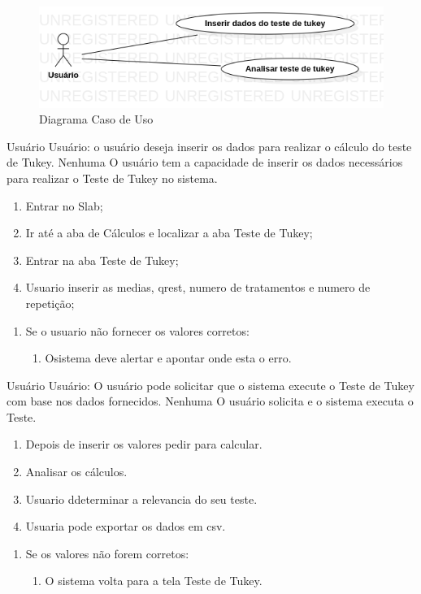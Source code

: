 \begin{figure}[H]
  \centering
  \includegraphics[width=0.8\linewidth]{imagens/casodeuso.png} 
  \caption{Diagrama Caso de Uso}
  \label{fig:exemplo}
\end{figure}


{Usuário}
{Usuário: o usuário deseja inserir os dados para realizar o cálculo do teste de Tukey.}
{Nenhuma}
{O usuário tem a capacidade de inserir os dados necessários para realizar o Teste de Tukey no sistema.}
{
	\begin{enumerate}[label=FB\arabic*.]
		
		\item Entrar no Slab;
		\item Ir até a aba de Cálculos e localizar a aba Teste de Tukey;
		\item Entrar na aba Teste de Tukey;
		\item Usuario inserir as medias, qrest, numero de tratamentos e numero de repetição;
		
	\end{enumerate}
}{
	\begin{enumerate}[label=FA\arabic*.]
		\item Se o usuario não fornecer os valores corretos:
			\begin{enumerate}
				\item Osistema deve alertar e apontar onde esta o erro.
			\end{enumerate}
	\end{enumerate}
}{}{}

{Usuário}
{Usuário: O usuário pode solicitar que o sistema execute o Teste de Tukey com base nos dados fornecidos.}
{Nenhuma}
{O usuário solicita e o sistema executa o Teste.}
{
	\begin{enumerate}[label=FB\arabic*.]
	
		\item Depois de inserir os valores pedir para calcular.
		\item Analisar os cálculos.
		\item Usuario ddeterminar a relevancia do seu teste.
		\item Usuaria pode exportar os dados em csv.
		
	\end{enumerate}
}{
	\begin{enumerate}[label=FA\arabic*.]
		\item Se os valores não forem corretos:
			\begin{enumerate}
				\item O sistema volta para a tela Teste de Tukey.
			\end{enumerate}
	\end{enumerate}
}{}{}


